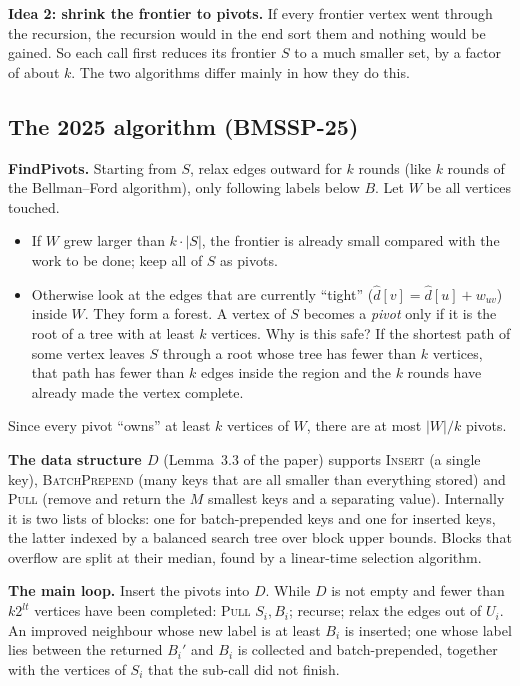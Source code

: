 \documentclass[11pt,a4paper]{article}
\newcommand{\dhat}{\widehat{d}}
\newcommand{\bmA}{BMSSP-25}
\begin{document}
\textbf{Idea 2: shrink the frontier to pivots.} If every frontier vertex went through the recursion, the recursion would in the end sort them and nothing would be gained. So each call first reduces its frontier $S$ to a much smaller set, by a factor of about $k$. The two algorithms differ mainly in how they do this.

\subsection{The 2025 algorithm (\bmA)}
\textbf{FindPivots.} Starting from $S$, relax edges outward for $k$ rounds (like $k$ rounds of the Bellman--Ford algorithm), only following labels below $B$. Let $W$ be all vertices touched.
\begin{itemize}
\item If $W$ grew larger than $k\cdot|S|$, the frontier is already small compared with the work to be done; keep all of $S$ as pivots.
\item Otherwise look at the edges that are currently ``tight'' ($\dhat[v]=\dhat[u]+w_{uv}$) inside $W$. They form a forest. A vertex of $S$ becomes a \emph{pivot} only if it is the root of a tree with at least $k$ vertices. Why is this safe? If the shortest path of some vertex leaves $S$ through a root whose tree has fewer than $k$ vertices, that path has fewer than $k$ edges inside the region and the $k$ rounds have already made the vertex complete.
\end{itemize}
Since every pivot ``owns'' at least $k$ vertices of $W$, there are at most $|W|/k$ pivots.

\textbf{The data structure $D$} (Lemma~3.3 of the paper) supports \textsc{Insert} (a single key), \textsc{BatchPrepend} (many keys that are all smaller than everything stored) and \textsc{Pull} (remove and return the $M$ smallest keys and a separating value). Internally it is two lists of blocks: one for batch-prepended keys and one for inserted keys, the latter indexed by a balanced search tree over block upper bounds. Blocks that overflow are split at their median, found by a linear-time selection algorithm.

\textbf{The main loop.} Insert the pivots into $D$. While $D$ is not empty and fewer than $k2^{lt}$ vertices have been completed: \textsc{Pull} $S_i,B_i$; recurse; relax the edges out of $U_i$. An improved neighbour whose new label is at least $B_i$ is inserted; one whose label lies between the returned $B_i'$ and $B_i$ is collected and batch-prepended, together with the vertices of $S_i$ that the sub-call did not finish.
\end{document}
